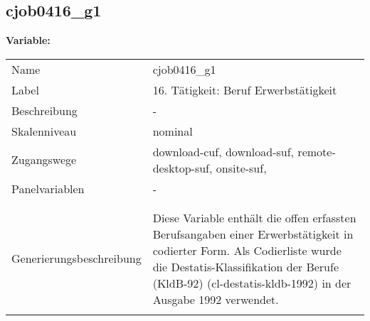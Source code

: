 	
	
	\subsection{cjob0416\_g1}
	\label{subSection:cjob0416_g1}

	\noindent\textbf{Variable:}\\
		\begin{tabular}{lL{11.3cm}}
			\label{tableVariable:cjob0416_g1}
			Name & cjob0416\_g1 \\
			Label & 16. Tätigkeit: Beruf Erwerbstätigkeit \\
			Beschreibung & - \\
			Skalenniveau & nominal \\
			Zugangswege &
				download-cuf,
				download-suf,
				remote-desktop-suf,
				onsite-suf,
 \\
			Panelvariablen & -
			 \\
			 \\
 \\
					Generierungsbeschreibung & Diese Variable enthält die offen erfassten Berufsangaben einer Erwerbstätigkeit in codierter Form. Als Codierliste wurde die Destatis-Klassifikation der Berufe (KldB-92) (cl-destatis-kldb-1992) in der Ausgabe 1992 verwendet. 
				 \\	
			 \\
		\end{tabular}






